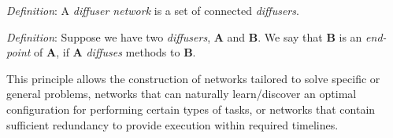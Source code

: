 \documentclass[11pt]{amsart}
\begin{document}
\begin{description}
	\emph{Definition}: A \emph{diffuser network} is a set of connected \emph{diffusers}.
	
	\emph{Definition}: Suppose we have two \emph{diffusers}, \textbf{A} and \textbf{B}. We say that \textbf{B} is an \emph{end-point} of \textbf{A}, if \textbf{A} \emph{diffuses} methods to \textbf{B}.
	
	This principle allows the construction of networks tailored to solve specific or general problems, networks that can naturally learn/discover an optimal configuration for performing certain types of tasks, or networks that contain sufficient redundancy to provide execution within required timelines.

\end{description}




\end{document}
